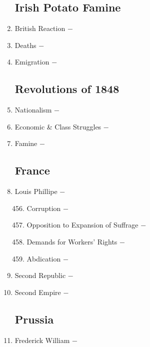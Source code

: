\documentclass[12pt]{article}
\begin{document}
\begin{enumerate}
\subsection{Irish Potato Famine}
\item British Reaction $-$ 

\item Deaths $-$ 

\item Emigration $-$

\subsection{Revolutions of 1848}

\item Nationalism $-$ 

\item Economic \& Class Struggles $-$

\item Famine $-$

\subsection{France}

\item Louis Phillipe $-$ 

\begin{enumerate}[label=\arabic{*}.]
\setcounter{enumii}{455}

\item Corruption $-$ 

\item Opposition to Expansion of Suffrage $-$ 

\item Demands for Workers' Rights $-$ 

\item Abdication $-$

\end{enumerate}
\setcounter{enumi}{459}

\item Second Republic $-$ 

\item Second Empire $-$ 

\subsection{Prussia}

\item Frederick William $-$ 


\end{enumerate}
\end{document}
